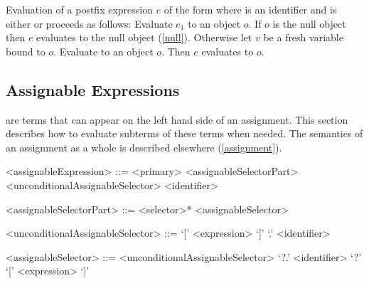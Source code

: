 \documentclass[makeidx]{article}
\begin{document}
\LMHash{}%
Evaluation of a postfix expression $e$ of the form 
where \id{} is an identifier and \op{} is either \lit{++} or \lit{-{}-}
proceeds as follows:
Evaluate $e_1$ to an object $o$.
If $o$ is the null object then $e$ evaluates to the null object
(\ref{null}).
Otherwise let $v$ be a fresh variable bound to $o$.
Evaluate  to an object $o$.
Then $e$ evaluates to $o$.
\EndCase


\subsection{Assignable Expressions}

\LMHash{}%
 are terms
that can appear on the left hand side of an assignment.
This section describes how to evaluate subterms of these terms when needed.
The semantics of an assignment as a whole is described elsewhere
(\ref{assignment}).


\begin{grammar}
<assignableExpression> ::= <primary> <assignableSelectorPart>
  \alt \SUPER{} <unconditionalAssignableSelector>
  \alt <identifier>

<assignableSelectorPart> ::= <selector>* <assignableSelector>

<unconditionalAssignableSelector> ::= `[' <expression> `]'
  \alt `.' <identifier>

<assignableSelector> ::= <unconditionalAssignableSelector>
  \alt `?.' <identifier>
  \alt `?' `[' <expression> `]'

\end{grammar}
\end{document}
